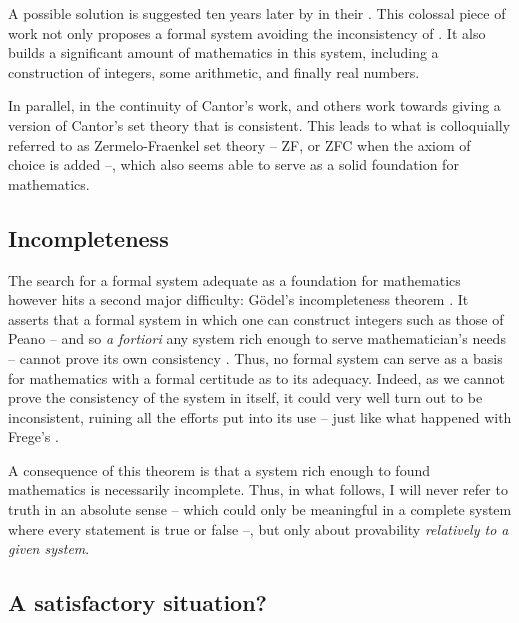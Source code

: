 A possible solution is suggested ten years later  by \citeauthor{Whitehead1913} in their
 . This colossal piece of work
not only proposes a formal system avoiding the inconsistency
of . It also builds a significant amount
of mathematics in this system, including a construction of integers,
some arithmetic, and finally real numbers.

In parallel, in the continuity of Cantor’s work,  and others
work towards giving a version of Cantor’s set theory that is consistent. This leads to what
is colloquially referred to as Zermelo-Fraenkel set theory – ZF, or ZFC when the
axiom of choice  is added –, which also seems able to serve as a
solid foundation for mathematics.

\subsection{Incompleteness}

The search for a formal system adequate as a foundation for mathematics however hits a
second major difficulty: Gödel’s incompleteness theorem . It asserts
that a formal system in which one can construct integers such as those of Peano – and so
\textit{a fortiori} any system rich enough to serve mathematician’s needs – cannot
prove its own consistency%
.
Thus, no formal system can serve as a basis for mathematics
with a formal certitude as to its adequacy.
Indeed, as we cannot prove the consistency of the system in itself, it could very well
turn out to be inconsistent, ruining all the efforts put into its use – just like what
happened with Frege’s .

A consequence of this theorem is that a system rich enough to found mathematics is
necessarily incomplete.%
Thus, in what follows, I will never refer to truth in an absolute sense – which could
only be meaningful in a complete system where every statement is true or false –, but
only about provability \emph{relatively to a given system}.

\subsection{A satisfactory situation?}

